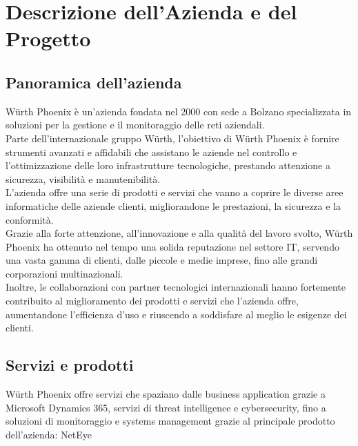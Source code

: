 \chapter{Descrizione dell'Azienda e del Progetto}
\label{cha:azienda_progetto}

\section{Panoramica dell'azienda}
\label{sec:panoramica} Würth Phoenix è un'azienda fondata nel 2000 con sede a
Bolzano specializzata in soluzioni per la gestione e il monitoraggio delle reti
aziendali.\\ Parte dell'internazionale gruppo Würth, l'obiettivo di Würth Phoenix
è fornire strumenti avanzati e affidabili che assistano le aziende nel controllo
e l'ottimizzazione delle loro infrastrutture tecnologiche, prestando attenzione
a sicurezza, visibilità e manutenibilità.\\ L'azienda offre una serie di prodotti
e servizi che vanno a coprire le diverse aree informatiche delle aziende clienti,
migliorandone le prestazioni, la sicurezza e la conformità.\\ Grazie alla forte attenzione,
all'innovazione e alla qualità del lavoro svolto, Würth Phoenix ha ottenuto nel tempo
una solida reputazione nel settore IT, servendo una vasta gamma di clienti, dalle
piccole e medie imprese, fino alle grandi corporazioni multinazionali.\\ Inoltre,
le collaborazioni con partner tecnologici internazionali hanno fortemente contribuito
al miglioramento dei prodotti e servizi che l'azienda offre, aumentandone l'efficienza
d'uso e riuscendo a soddisfare al meglio le esigenze dei clienti.

\section{Servizi e prodotti}
\label{sec:servizi_prodotti} Würth Phoenix offre servizi che spaziano dalle
business application grazie a Microsoft Dynamics 365, servizi di threat intelligence
e cybersecurity, fino a soluzioni di monitoraggio e systems management grazie al
principale prodotto dell'azienda: NetEye\\

